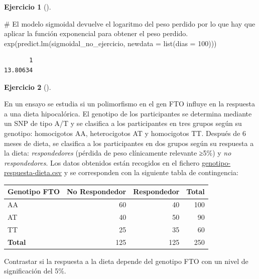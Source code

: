\documentclass[
  spanish,
  a4paper,
]{scrreport}
\newenvironment{Shaded}{\begin{snugshade}}{\end{snugshade}}
\newcommand{\AttributeTok}[1]{\textcolor[rgb]{0.40,0.45,0.13}{#1}}
\newcommand{\CommentTok}[1]{\textcolor[rgb]{0.37,0.37,0.37}{#1}}
\newcommand{\DecValTok}[1]{\textcolor[rgb]{0.68,0.00,0.00}{#1}}
\newcommand{\FunctionTok}[1]{\textcolor[rgb]{0.28,0.35,0.67}{#1}}
\newcommand{\NormalTok}[1]{\textcolor[rgb]{0.00,0.23,0.31}{#1}}
\newcounter{none} %
\theoremstyle{definition}
\newtheorem{exercise}{Ejercicio}[chapter]
\theoremstyle{remark}
\begin{document}
\begin{exercise}[]
\begin{enumerate}
\begin{tcolorbox}
\begin{Shaded}
\begin{Highlighting}[]
\CommentTok{\# El modelo sigmoidal devuelve el logaritmo del peso perdido por lo que hay que aplicar la función exponencial para obtener el peso perdido.}
\FunctionTok{exp}\NormalTok{(}\FunctionTok{predict.lm}\NormalTok{(sigmoidal\_no\_ejercicio, }\AttributeTok{newdata =} \FunctionTok{list}\NormalTok{(}\AttributeTok{dias =} \DecValTok{100}\NormalTok{)))}
\end{Highlighting}
\end{Shaded}

\begin{verbatim}
       1 
13.80634 
\end{verbatim}

  \end{tcolorbox}
\end{enumerate}

\end{exercise}

\begin{exercise}[]\protect\hypertarget{exr-chi-cuadrado-genotipo-respuesta-dieta}{}\label{exr-chi-cuadrado-genotipo-respuesta-dieta}

En un ensayo se estudia si un polimorfismo en el gen FTO influye en la
respuesta a una dieta hipocalórica. El genotipo de los participantes se
determina mediante un SNP de tipo A/T y se clasifica a los participantes
en tres grupos según su genotipo: homocigotos AA, heterocigotos AT y
homocigotos TT. Después de 6 meses de dieta, se clasifica a los
participantes en dos grupos según su respuesta a la dieta:
\emph{respondedores} (pérdida de peso clínicamente relevante ≥5\%) y
\emph{no respondedores}. Los datos obtenidos están recogidos en el
fichero
\href{datos/genotipo-respuesta-dieta.csv}{genotipo-respuesta-dieta.csv}
y se corresponden con la siguiente tabla de contingencia:

{\def\LTcaptype{none} %
\begin{longtable}[]{@{}lrrr@{}}
\toprule\noalign{}
Genotipo FTO & No Respondedor & Respondedor & Total \\
\midrule\noalign{}
\endhead
\bottomrule\noalign{}
\endlastfoot
AA & 60 & 40 & 100 \\
AT & 40 & 50 & 90 \\
TT & 25 & 35 & 60 \\
\textbf{Total} & 125 & 125 & 250 \\
\end{longtable}
}

Contrastar si la respuesta a la dieta depende del genotipo FTO con un
nivel de significación del 5\%.

\end{exercise}
\end{document}
